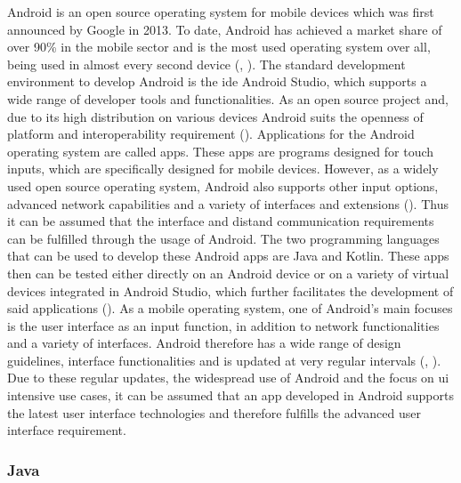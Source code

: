 Android is an open source operating system for mobile devices which was first announced by Google in 2013. To date, Android has achieved a market share of over 90\% in the mobile sector and is the most used operating system over all, being used in almost every second device (\cite{statcounter.2023}, \cite{Richter.2019}). The standard development environment to develop Android is the \ac{ide} Android Studio, which supports a wide range of developer tools and functionalities. As an open source project and, due to its high distribution on various devices Android suits the openness of platform and interoperability requirement (\cite{Richter.2019}). Applications for the Android operating system are called apps. These apps are programs designed for touch inputs, which are specifically designed for mobile devices. However, as a widely used open source operating system, Android also supports other input options, advanced network capabilities and a variety of interfaces and extensions (\cite{Richter.2019}). Thus it can be assumed that the interface and distand communication requirements can be fulfilled through the usage of Android. The two programming languages that can be used to develop these Android apps are Java and Kotlin. These apps then can be tested either directly on an Android device or on a variety of virtual devices integrated in Android Studio, which further facilitates the development of said applications (\cite{Richter.2019}). As a mobile operating system, one of Android's main focuses is the user interface as an input function, in addition to network functionalities and a variety of interfaces. Android therefore has a wide range of design guidelines, interface functionalities and is updated at very regular intervals (\cite{statista.2023}, \cite{Richter.2019}). Due to these regular updates, the widespread use of Android and the focus on \ac{ui} intensive use cases, it can be assumed that an app developed in Android supports the latest user interface technologies and therefore fulfills the advanced user interface requirement.


\subsubsection{Java}


